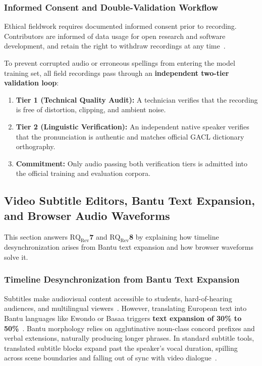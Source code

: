 \documentclass[a4paper,11pt]{article}
\begin{document}
\subsubsection{Informed Consent and Double-Validation Workflow}
\label{sec:chap2_double_val}
Ethical fieldwork requires documented informed consent prior to recording. Contributors are informed of data usage for open research and software development, and retain the right to withdraw recordings at any time~\cite{gebru2021datasheets, grenoble2010language}.

To prevent corrupted audio or erroneous spellings from entering the model training set, all field recordings pass through an \textbf{independent two-tier validation loop}:
\begin{enumerate}
    \item \textbf{Tier 1 (Technical Quality Audit):} A technician verifies that the recording is free of distortion, clipping, and ambient noise.
    \item \textbf{Tier 2 (Linguistic Verification):} An independent native speaker verifies that the pronunciation is authentic and matches official GACL dictionary orthography.
    \item \textbf{Commitment:} Only audio passing both verification tiers is admitted into the official training and evaluation corpora.
\end{enumerate}

\subsection{Video Subtitle Editors, Bantu Text Expansion, and Browser Audio Waveforms}
\label{sec:chap2_editor}

This section answers \textbf{$\text{RQ}_{\text{Rev}}$7} and \textbf{$\text{RQ}_{\text{Rev}}$8} by explaining how timeline desynchronization arises from Bantu text expansion and how browser waveforms solve it.

\subsubsection{Timeline Desynchronization from Bantu Text Expansion}
\label{sec:chap2_text_expansion}
Subtitles make audiovisual content accessible to students, hard-of-hearing audiences, and multilingual viewers~\cite{mayer2020multimedia}. However, translating European text into Bantu languages like Ewondo or Basaa triggers \textbf{text expansion of 30\% to 50\%}~\cite{essono2000ewondo, lemb1973dictionnaire}. Bantu morphology relies on agglutinative noun-class concord prefixes and verbal extensions, naturally producing longer phrases. In standard subtitle tools, translated subtitle blocks expand past the speaker's vocal duration, spilling across scene boundaries and falling out of sync with video dialogue~\cite{bigioi2023multilingual, won2025endtoend}.
\end{document}
